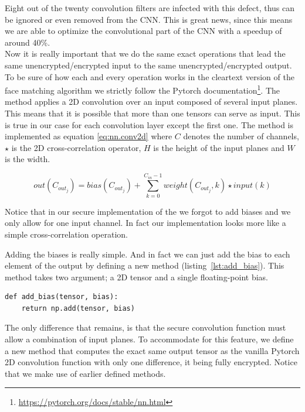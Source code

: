 Eight out of the twenty convolution filters are infected with this defect, thus can be ignored or even removed from the CNN. This is great news, since this means we are able to optimize the convolutional part of the CNN with a speedup of around 40\%.\\

Now it is really important that we do the same exact operations that lead the same unencrypted/encrypted input to the same unencrypted/encrypted output. To be sure of how each and every operation works in the cleartext version of the face matching algorithm we strictly follow the Pytorch documentation\footnote{\url{https://pytorch.org/docs/stable/nn.html}}. The  method applies a 2D convolution over an input composed of several input planes. This means that it is possible that more than one tensors can serve as input. This is true in our case for each convolution layer except the first one. The method is implemented as equation \ref{eq:nn.conv2d} where $C$ denotes the number of channels, $\star$ is the 2D cross-correlation operator, $H$ is the height of the input planes and $W$ is the width.

\begin{equation} \label{eq:nn.conv2d}
  out(C_{out_j}) = bias(C_{out_j}) + \sum_{k=0}^{C_{in}-1}weight(C_{out_j},k) \star input(k)
\end{equation}

Notice that in our secure implementation of the  we forgot to add biases and we only allow for one input channel. In fact our implementation looks more like a simple cross-correlation operation.

Adding the biases is really simple. And in fact we can just add the bias to each element of the output by defining a new method  (listing~\ref{lst:add_bias}). This method takes two argument; a 2D tensor and a single floating-point bias.

\begin{lstlisting}[caption={Code for adding bias to matrix}, label={lst:add_bias}, frame=single, breaklines=true]
def add_bias(tensor, bias):
    return np.add(tensor, bias)
\end{lstlisting}

The only difference that remains, is that the secure convolution function must allow a combination of input planes. To accommodate for this feature, we define a new method  that computes the exact same output tensor as the vanilla Pytorch 2D convolution function with only one difference, it being fully encrypted. Notice that we make use of earlier defined methods.

